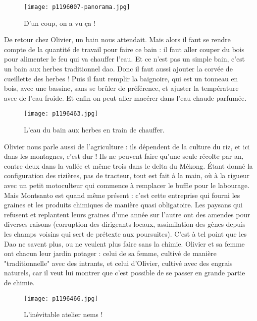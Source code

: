 \documentclass{book}
\begin{document}
\begin{figure}[h]
\centering
\texttt{[image: p1196007-panorama.jpg]}
\caption*{D'un coup, on a vu ça !}
\end{figure}

De retour chez Olivier, un bain nous attendait. Mais alors il faut se rendre compte de la quantité de travail pour faire ce bain : il faut aller couper du bois pour alimenter le feu qui va chauffer l'eau. Et ce n'est pas un simple bain, c'est un bain aux herbes traditionnel dao. Donc il faut aussi ajouter la corvée de cueillette des herbes ! Puis il faut remplir la baignoire, qui est un tonneau en bois, avec une bassine, sans se brûler de préférence, et ajuster la température avec de l'eau froide. Et enfin on peut aller macérer dans l'eau chaude parfumée.


\begin{figure}[h]
\centering
\texttt{[image: p1196463.jpg]}
\caption*{L'eau du bain aux herbes en train de chauffer.}
\end{figure}

Olivier nous parle aussi de l'agriculture : ils dépendent de la culture du riz, et ici dans les montagnes, c'est dur ! Ils ne peuvent faire qu'une seule récolte par an, contre deux dans la vallée et même trois dans le delta du Mékong. Étant donné la configuration des rizières, pas de tracteur, tout est fait à la main, où à la rigueur avec un petit motoculteur qui commence à remplacer le buffle pour le labourage. Mais Montsanto est quand même présent : c'est cette entreprise qui fourni les graines et les produits chimiques de manière quasi obligatoire. Les paysans qui refusent et replantent leurs graines d'une année sur l'autre ont des amendes pour diverses raisons (corruption des dirigeants locaux, assimilation des gènes depuis les champs voisins qui sert de prétexte aux poursuites). C'est à tel point que les Dao ne savent plus, ou ne veulent plus faire sans la chimie. Olivier et sa femme ont chacun leur jardin potager : celui de sa femme, cultivé de manière "traditionnelle" avec des intrants, et celui d'Olivier, cultivé avec des engrais naturels, car il veut lui montrer que c'est possible de se passer en grande partie de chimie.


\begin{figure}[h]
\centering
\texttt{[image: p1196466.jpg]}
\caption*{L'inévitable atelier nems !}
\end{figure}
\end{document}
